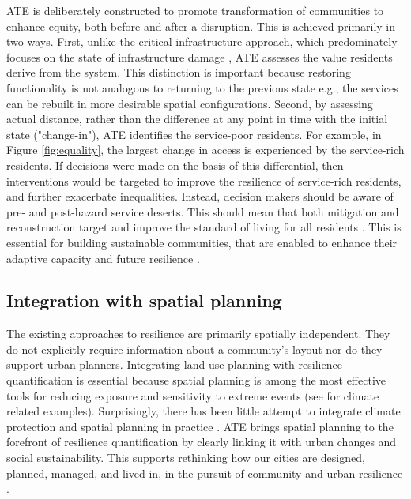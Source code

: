 \documentclass[9pt,twocolumn,twoside,lineno]{pnas-new}
\begin{document}
ATE is deliberately constructed to promote transformation of communities to enhance equity, both before and after a disruption. 
This is achieved primarily in two ways.
First, unlike the critical infrastructure approach, which predominately focuses on the state of infrastructure damage \cite{Cutter2010-vg}, ATE assesses the value residents derive from the system. 
This distinction is important because restoring functionality is not analogous to returning to the previous state e.g., the services can be rebuilt in more desirable spatial configurations.
Second, by assessing actual distance, rather than the difference at any point in time with the initial state ("change-in"), ATE identifies the service-poor residents. 
For example, in Figure \ref{fig:equality}, the largest change in access is experienced by the service-rich residents.
If decisions were made on the basis of this differential, then interventions would be targeted to improve the resilience of service-rich residents, and further exacerbate inequalities.
Instead, decision makers should be aware of pre- and post-hazard service deserts. 
This should mean that both mitigation and reconstruction target and improve the standard of living for all residents \cite{Pantelic1991-qu}. 
This is essential for building sustainable communities, that are enabled to enhance their adaptive capacity and future resilience \cite{Saunders2015-uz}.

\subsection*{Integration with spatial planning}
The existing approaches to resilience are primarily spatially independent.
They do not explicitly require information about a community's layout nor do they support urban planners. 
Integrating land use planning with resilience quantification is essential because spatial planning is among the most effective tools for reducing exposure and sensitivity to extreme events \cite{Brunetta2019-ki, Campbell2006-in, Hurlimann2012-uj} (see \cite{Anderson2018-hr} for climate related examples). 
Surprisingly, there has been little attempt to integrate climate protection and spatial planning in practice \cite{Barnes2017-xf}.
ATE brings spatial planning to the forefront of resilience quantification by clearly linking it with urban changes and social sustainability.
This supports rethinking how our cities are designed, planned, managed, and lived in, in the pursuit of community and urban resilience \cite{Caldarice2019-tv}. 
\end{document}
